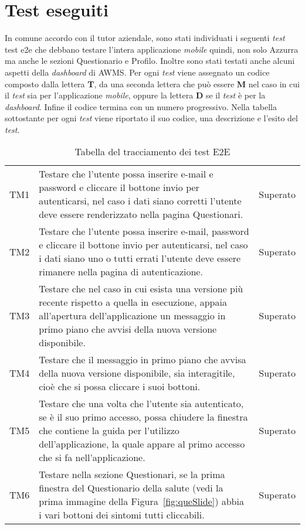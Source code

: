 \section{Test eseguiti}
In comune accordo con il tutor aziendale, sono stati individuati i seguenti \emph{test} \gls{test e2e} che debbano testare l'intera applicazione \emph{mobile} quindi, non solo Azzurra ma anche le sezioni Questionario e Profilo. Inoltre sono stati testati anche alcuni aspetti della \emph{dashboard} di \gls{AWMS}. Per ogni \emph{test} viene assegnato un codice composto dalla lettera \textbf{T}, da una seconda lettera che può essere \textbf{M} nel caso in cui il \emph{test} sia per l'applicazione \emph{mobile}, oppure la lettera \textbf{D} se il \emph{test} è per la \emph{dashboard}. Infine il codice termina con un numero progressivo. Nella tabella sottostante per ogni \emph{test} viene riportato il suo codice, una descrizione e l'esito del \emph{test}.
\begin{table}[h]%
	\renewcommand{\arraystretch}{1.4}
	\centering
	\begin{tabularx}{\textwidth}{c X c}
		\hline	
		\rowcolor{heavenly}
		\intest{Codice} &  \intest{Descrizione} & \intest{Esito}\\	
		\hline			
		TM1 & Testare che l'utente possa inserire e-mail e password e cliccare il bottone invio per autenticarsi, nel caso i dati siano corretti l'utente deve essere renderizzato nella pagina Questionari. & Superato\\
		TM2 & Testare che l'utente possa inserire e-mail, password e cliccare il bottone invio per autenticarsi, nel caso i dati siano uno o tutti errati l'utente deve essere rimanere nella pagina di autenticazione. & Superato\\
		TM3 & Testare che nel caso in cui esista una versione più recente rispetto a quella in esecuzione, appaia all'apertura dell'applicazione un messaggio in primo piano che avvisi della nuova versione disponibile. & Superato\\
		TM4 & Testare che il messaggio in primo piano che avvisa della nuova versione disponibile, sia interagitile, cioè che si possa cliccare i suoi bottoni. & Superato\\
		TM5 & Testare che una volta che l'utente sia autenticato, se è il suo primo accesso, possa chiudere la finestra che contiene la guida per l'utilizzo dell'applicazione, la quale appare al primo accesso che si fa nell'applicazione. & Superato\\
		TM6 & Testare nella sezione Questionari, se la prima finestra del Questionario della salute (vedi la prima immagine della Figura~\ref{fig:queSlide}) abbia i vari bottoni dei sintomi tutti cliccabili. & Superato\\
		\hline
	\end{tabularx} \hbox{}
	\caption{Tabella del tracciamento dei test E2E}
\end{table}%
	
